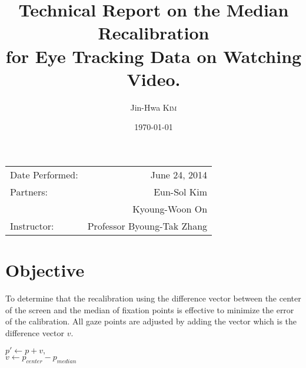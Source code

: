 \documentclass{article}
\title{Technical Report on the Median Recalibration \\
for Eye Tracking Data on Watching Video.} %
\author{Jin-Hwa \textsc{Kim}} %
\date{\today} %
\begin{document}
\maketitle %

\begin{center}
\begin{tabular}{l r}
Date Performed: & June 24, 2014 \\ %
Partners: & Eun-Sol Kim \\ %
& Kyoung-Woon On \\
Instructor: & Professor Byoung-Tak Zhang %
\end{tabular}
\end{center}



\section{Objective}

To determine that the recalibration using the difference vector between the center of the screen and the median of fixation points is effective to minimize the error of the calibration. All gaze points are adjusted by adding the vector which is the difference vector $v$.

\begin{center}${p}' \leftarrow p + v, $\\
$v \leftarrow p_{center} - p_{median}$\end{center}

\end{document}
